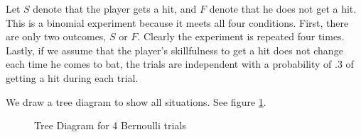 \begin{solution}
    Let \( S \) denote that the player gets a hit, and \( F \) denote that he does not get a hit. This is a binomial experiment because it meets all four conditions. First, there are only two outcomes, \( S \) or \( F \). Clearly the experiment is repeated four times. Lastly, if we assume that the player's skillfulness to get a hit does not change each time he comes to bat, the trials are independent with a probability of .3 of getting a hit during each trial.

    We draw a tree diagram to show all situations. See figure \ref{figure_bernoulli_tree}.
    \begin{figure}[ht!]
        \label{figure_bernoulli_tree}
        \caption[short]{Tree Diagram for 4 Bernoulli trials}
\end{figure}
\end{solution}
